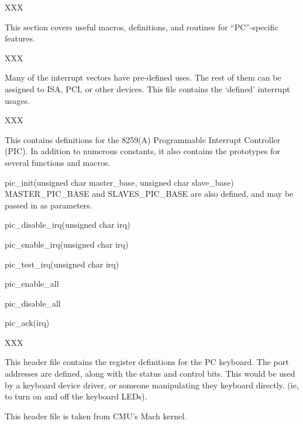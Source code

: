 XXX

This section covers useful macros, definitions, and routines for
``PC''-specific features.

\label{irq-list-h}
\begin{apisyn}
\end{apisyn}
\begin{apidesc}
	XXX

	Many of the interrupt vectors have pre-defined uses.
	The rest of them can be assigned to ISA, PCI, or other devices.
	This file contains the `defined' interrupt usages.
\end{apidesc}


\begin{apisyn}
\end{apisyn}
\begin{apidesc}
	XXX

	This contains definitions for the 8259(A) Programmable
	Interrupt Controller (PIC).
	In addition to numerous constants, it also contains the
	prototypes for several functions and macros.

	\begin{csymlist}
	\item[pic_init(unsigned char master_base, unsigned char slave_base)]
		\label{pic-init}
		MASTER_PIC_BASE and SLAVES_PIC_BASE are also defined,
		and may be passed in as parameters.
	\item[pic_disable_irq(unsigned char irq)]
		\label{pic-disable-irq}
	\item[pic_enable_irq(unsigned char irq)]
		\label{pic-enable-irq}
	\item[pic_test_irq(unsigned char irq)]
		\label{pic-test-irq}
	\item[pic_enable_all]
		\label{pic-enable-all}
	\item[pic_disable_all]
		\label{pic-disable-all}
	\item[pic_ack(irq)]
		\label{pic-ack}
	\end{csymlist}
\end{apidesc}


\begin{apisyn}
\end{apisyn}
\begin{apidesc}
	XXX

	This header file contains the register definitions for the
	PC keyboard.  The port addresses are defined, along with
	the status and control bits.  This would be used by a keyboard
	device driver, or someone manipulating they keyboard directly.
	(ie, to turn on and off the keyboard LEDs).

	This header file is taken from CMU's Mach kernel.
\end{apidesc}


